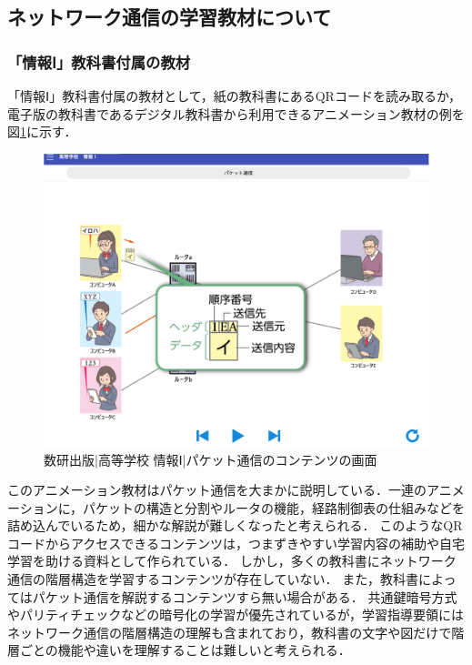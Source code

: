 \documentclass[12pt,a4j,titlepage]{ltjsarticle}
\begin{document}
\subsection{ネットワーク通信の学習教材について}
\subsubsection{「情報Ⅰ」教科書付属の教材}
「情報Ⅰ」教科書付属の教材として，紙の教科書にあるQRコードを読み取るか，電子版の教科書であるデジタル教科書から利用できるアニメーション教材の例を図\ref{fig:kou_anime}に示す\cite{koukou_anime}．
\begin{figure}[h]
\centering
\includegraphics[clip,width=150mm]{figures/koukou_anime.pdf}
\caption[数研出版|高等学校 情報Ⅰ|パケット通信のコンテンツの画面]{数研出版|高等学校 情報Ⅰ|パケット通信のコンテンツの画面\linebreak}
\label{fig:kou_anime}
\end{figure}

このアニメーション教材はパケット通信を大まかに説明している．一連のアニメーションに，パケットの構造と分割やルータの機能，経路制御表の仕組みなどを詰め込んでいるため，細かな解説が難しくなったと考えられる．
このようなQRコードからアクセスできるコンテンツは，つまずきやすい学習内容の補助や自宅学習を助ける資料として作られている\cite{koukou_qr}．
しかし，多くの教科書にネットワーク通信の階層構造を学習するコンテンツが存在していない．
また，教科書によってはパケット通信を解説するコンテンツすら無い場合がある\cite{koukou_kyokasyo}．
共通鍵暗号方式やパリティチェックなどの暗号化の学習が優先されているが，学習指導要領にはネットワーク通信の階層構造の理解も含まれており，教科書の文字や図だけで階層ごとの機能や違いを理解することは難しいと考えられる．
\end{document}
